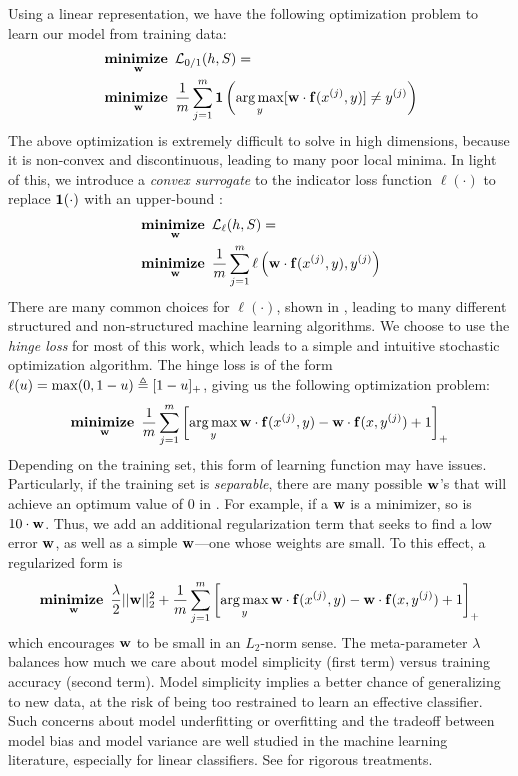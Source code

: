 Using a linear representation, we have the following optimization problem to learn our model from training data:
\begin{align}
&\mathop{\mathbf{minimize~}}_{\mathbf{w}} \mathcal{L}_{0/1}(h,S) = \\ &\mathop{\mathbf{minimize~}}_{\mathbf{w}} \frac{1}{m}\sum_{j=1}^m 
\mathbf{1}\left( \mathop{\arg\max}_y [\mathbf{w} \cdot \mathbf{f}(x^{(j)},y)] \neq y^{(j)}\right)
\end{align}
The above optimization is extremely difficult to solve in high dimensions, because it is non-convex and discontinuous, leading to many poor local minima.  In light of this, we introduce a {\em convex surrogate} to the indicator loss function $\ell(\cdot)$ to replace $\mathbf{1}(\cdot)$ with an upper-bound \citep{bishop-book}:
\begin{align}
&\mathop{\mathbf{minimize~}}_{\mathbf{w}} \mathcal{L}_{\ell}(h,S) = \\ &\mathop{\mathbf{minimize~}}_{\mathbf{w}} \frac{1}{m}\sum_{j=1}^m 
\ell\left( \mathbf{w} \cdot \mathbf{f}(x^{(j)},y), y^{(j)}\right)
\label{eq:convex-loss}
\end{align}
There are many common choices for $\ell(\cdot)$, shown in , 
leading to many different structured and non-structured machine learning 
algorithms.  We choose to use the {\em hinge loss} for most of this work, which 
leads to a simple and intuitive stochastic optimization algorithm.  The hinge 
loss is of the form $\ell(u) = \max (0,1-u) \triangleq [1-u]_+$, giving us the 
following optimization problem:
\begin{align}
\mathop{\mathbf{minimize~}}_{\mathbf{w}} \frac{1}{m}\sum_{j=1}^m \left[ \mathop{\arg\max}_y \mathbf{w} \cdot \mathbf{f}(x^{(j)},y) - \mathbf{w} \cdot \mathbf{f}(x,y^{(j)}) + 1\right]_+
\label{eq:svm-noreg}
\end{align}
Depending on the training set, this form of learning function may have issues.  
Particularly, if the training set is {\em separable}, there are many possible 
$\mathbf{w}$'s that will achieve an optimum value of $0$ in . For 
example, if a $\mathbf{w}$ is a minimizer, so is $10\cdot \mathbf{w}$.  Thus, we add an 
additional regularization term that seeks to find a low error $\mathbf{w}$, as well as 
a simple $\mathbf{w}$---one whose weights are small. To this effect, a regularized form 
is
\begin{align}
\mathop{\mathbf{minimize~}}_{\mathbf{w}} \frac{\lambda}{2}||\mathbf{w}||_2^2 + \frac{1}{m}\sum_{j=1}^m \left[ 
\mathop{\arg\max}_y \mathbf{w} \cdot \mathbf{f}(x^{(j)},y) - \mathbf{w} \cdot \mathbf{f}(x,y^{(j)}) + 1\right]_+
\label{eq:svm}
\end{align}
 which encourages $\mathbf{w}$ to be small in an $L_2$-norm sense.  The meta-parameter 
$\lambda$ balances how much we care about model simplicity (first term) versus 
training accuracy (second term).  Model simplicity implies a better chance of 
generalizing to new data, at the risk of being too restrained to learn an 
effective classifier.  Such concerns about model underfitting or overfitting 
and the tradeoff between model bias and model variance are well studied in the 
machine learning literature, especially for linear classifiers. See 
\citet{bishop-book, esl-book} for rigorous treatments.

